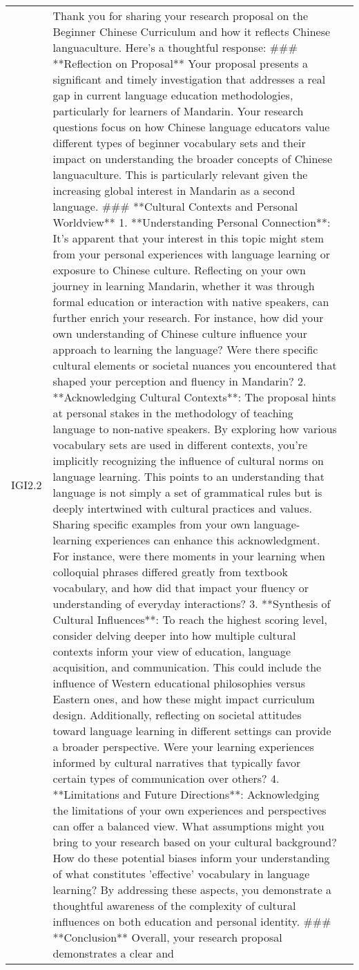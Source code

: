 \begin{longtable}{|p{}|p{}|p{}|}
IGI2.2 & Thank you for sharing your research proposal on the Beginner Chinese Curriculum and how it reflects Chinese languaculture. Here’s a thoughtful response:  \#\#\# **Reflection on Proposal**  Your proposal presents a significant and timely investigation that addresses a real gap in current language education methodologies, particularly for learners of Mandarin. Your research questions focus on how Chinese language educators value different types of beginner vocabulary sets and their impact on understanding the broader concepts of Chinese languaculture. This is particularly relevant given the increasing global interest in Mandarin as a second language.  \#\#\# **Cultural Contexts and Personal Worldview**  1. **Understanding Personal Connection**:    It's apparent that your interest in this topic might stem from your personal experiences with language learning or exposure to Chinese culture. Reflecting on your own journey in learning Mandarin, whether it was through formal education or interaction with native speakers, can further enrich your research. For instance, how did your own understanding of Chinese culture influence your approach to learning the language? Were there specific cultural elements or societal nuances you encountered that shaped your perception and fluency in Mandarin?  2. **Acknowledging Cultural Contexts**:    The proposal hints at personal stakes in the methodology of teaching language to non-native speakers. By exploring how various vocabulary sets are used in different contexts, you're implicitly recognizing the influence of cultural norms on language learning. This points to an understanding that language is not simply a set of grammatical rules but is deeply intertwined with cultural practices and values. Sharing specific examples from your own language-learning experiences can enhance this acknowledgment. For instance, were there moments in your learning when colloquial phrases differed greatly from textbook vocabulary, and how did that impact your fluency or understanding of everyday interactions?  3. **Synthesis of Cultural Influences**:    To reach the highest scoring level, consider delving deeper into how multiple cultural contexts inform your view of education, language acquisition, and communication. This could include the influence of Western educational philosophies versus Eastern ones, and how these might impact curriculum design. Additionally, reflecting on societal attitudes toward language learning in different settings can provide a broader perspective. Were your learning experiences informed by cultural narratives that typically favor certain types of communication over others?  4. **Limitations and Future Directions**:    Acknowledging the limitations of your own experiences and perspectives can offer a balanced view. What assumptions might you bring to your research based on your cultural background? How do these potential biases inform your understanding of what constitutes 'effective' vocabulary in language learning? By addressing these aspects, you demonstrate a thoughtful awareness of the complexity of cultural influences on both education and personal identity.  \#\#\# **Conclusion**  Overall, your research proposal demonstrates a clear and 
\end{longtable}
